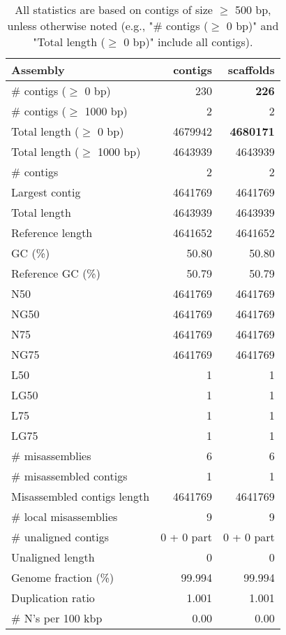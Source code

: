 \documentclass[12pt,a4paper]{article}
\begin{document}
\begin{table}[ht]
\begin{center}
\caption{All statistics are based on contigs of size $\geq$ 500 bp, unless otherwise noted (e.g., "\# contigs ($\geq$ 0 bp)" and "Total length ($\geq$ 0 bp)" include all contigs).}
\begin{tabular}{|l*{2}{|r}|}
\hline
Assembly & contigs & scaffolds \\ \hline
\# contigs ($\geq$ 0 bp) & 230 & {\bf 226} \\ \hline
\# contigs ($\geq$ 1000 bp) & 2 & 2 \\ \hline
Total length ($\geq$ 0 bp) & 4679942 & {\bf 4680171} \\ \hline
Total length ($\geq$ 1000 bp) & 4643939 & 4643939 \\ \hline
\# contigs & 2 & 2 \\ \hline
Largest contig & 4641769 & 4641769 \\ \hline
Total length & 4643939 & 4643939 \\ \hline
Reference length & 4641652 & 4641652 \\ \hline
GC (\%) & 50.80 & 50.80 \\ \hline
Reference GC (\%) & 50.79 & 50.79 \\ \hline
N50 & 4641769 & 4641769 \\ \hline
NG50 & 4641769 & 4641769 \\ \hline
N75 & 4641769 & 4641769 \\ \hline
NG75 & 4641769 & 4641769 \\ \hline
L50 & 1 & 1 \\ \hline
LG50 & 1 & 1 \\ \hline
L75 & 1 & 1 \\ \hline
LG75 & 1 & 1 \\ \hline
\# misassemblies & 6 & 6 \\ \hline
\# misassembled contigs & 1 & 1 \\ \hline
Misassembled contigs length & 4641769 & 4641769 \\ \hline
\# local misassemblies & 9 & 9 \\ \hline
\# unaligned contigs & 0 + 0 part & 0 + 0 part \\ \hline
Unaligned length & 0 & 0 \\ \hline
Genome fraction (\%) & 99.994 & 99.994 \\ \hline
Duplication ratio & 1.001 & 1.001 \\ \hline
\# N's per 100 kbp & 0.00 & 0.00 \\ \hline

\end{tabular}
\end{center}
\end{table}
\end{document}
